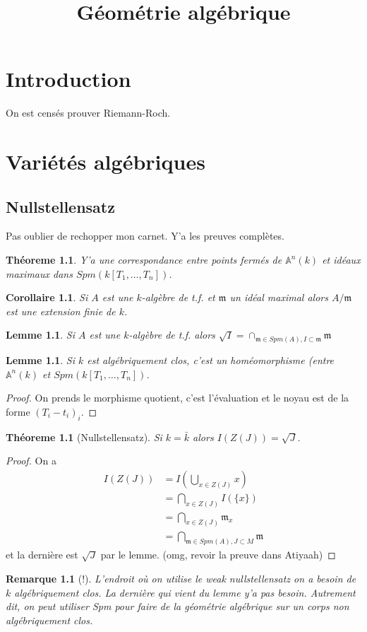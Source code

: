 \documentclass[a4paper,12pt]{book}
\title{Géométrie algébrique}
\date{}
\newcommand{\A}{\mathbb{A}}
\newcommand{\m}{\mathfrak{m}}
\theoremstyle{plain}
\newtheorem{thm}[subsection]{Théoreme}
\newtheorem{lem}[subsection]{Lemme}
\newtheorem{cor}[subsection]{Corollaire}
\newtheorem{rem}{Remarque}
\theoremstyle{definition}
\theoremstyle{remark}
\begin{document}
\maketitle
\tableofcontents
\chapter*{Introduction}
On est censés prouver Riemann-Roch.
\chapter{Variétés algébriques}
\section{Nullstellensatz}
Pas oublier de rechopper mon carnet. Y'a les preuves complètes.

\begin{thm}
    Y'a une correspondance entre points fermés de
    $\A^n(k)$ et idéaux maximaux dans $Spm(k[T_1,\ldots,T_n])$.
\end{thm}
\begin{cor}
    Si $A$ est une $k$-algèbre de t.f. et $\m$ un idéal maximal
    alors $A/\m$ est une extension finie de $k$.
\end{cor}

\begin{lem}
    Si $A$ est une $k$-algèbre de t.f. alors 
    $\sqrt I = \cap_{\m \in Spm(A), I\subset \m}\m$
\end{lem}
\begin{lem}
    Si $k$ est algébriquement clos, c'est un homéomorphisme (entre
    $\A^n(k)$ et $Spm(k[T_1,\ldots,T_n])$.
\end{lem}
\begin{proof}
    On prends le morphisme quotient, c'est l'évaluation et le noyau est
    de la forme $(T_i-t_i)_i$.
\end{proof}
\begin{thm}[Nullstellensatz]
    Si $k=\bar k$ alors $I(Z(J))=\sqrt J$.
\end{thm}
\begin{proof}
    On a 
    \begin{align*}
	I(Z(J))&=I(\bigcup_{x\in Z(J)}{x})\\
	       &=\bigcap_{x\in Z(J)}I(\{x\})\\
	       &=\bigcap_{x\in Z(J)} \m_x\\
	       &=\bigcap_{\m\in Spm(A), J\subset M} \m
    \end{align*}
    et la dernière est $\sqrt J$ par le lemme. (omg, revoir la preuve
    dans Atiyaah)
\end{proof}
\begin{rem}[!]
    L'endroit où on utilise le weak nullstellensatz on a besoin de $k$
    algébriquement clos. La dernière qui vient du lemme y'a pas besoin.
    Autrement dit, on peut utiliser Spm pour faire de la géométrie 
    algébrique sur un corps non algébriquement clos.
\end{rem}
\end{document}
